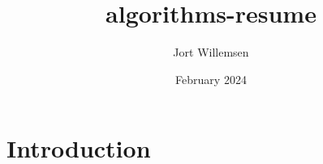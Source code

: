 \documentclass{article}
\title{algorithms-resume}
\author{Jort Willemsen}
\date{February 2024}
\begin{document}
\maketitle

\section{Introduction}
\end{document}
